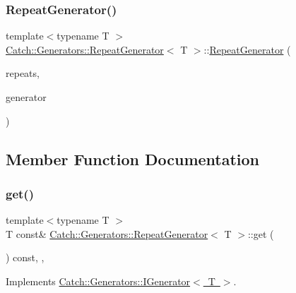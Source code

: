 \subsubsection{\texorpdfstring{Repeat\+Generator()}{RepeatGenerator()}}
{\footnotesize\ttfamily template$<$typename T $>$ \\
\mbox{\hyperlink{class_catch_1_1_generators_1_1_repeat_generator}{Catch\+::\+Generators\+::\+Repeat\+Generator}}$<$ T $>$\+::\mbox{\hyperlink{class_catch_1_1_generators_1_1_repeat_generator}{Repeat\+Generator}} (\begin{DoxyParamCaption}\item[{size\+\_\+t}]{repeats,  }\item[{\mbox{\hyperlink{class_catch_1_1_generators_1_1_generator_wrapper}{Generator\+Wrapper}}$<$ T $>$ \&\&}]{generator }\end{DoxyParamCaption})\hspace{0.3cm}{\ttfamily [inline]}}



\subsection{Member Function Documentation}
\mbox{\label{class_catch_1_1_generators_1_1_repeat_generator_a43bd573274c9a0cd7f4406a3d0d36d49}} 
\subsubsection{\texorpdfstring{get()}{get()}}
{\footnotesize\ttfamily template$<$typename T $>$ \\
T const\& \mbox{\hyperlink{class_catch_1_1_generators_1_1_repeat_generator}{Catch\+::\+Generators\+::\+Repeat\+Generator}}$<$ T $>$\+::get (\begin{DoxyParamCaption}{ }\end{DoxyParamCaption}) const\hspace{0.3cm}{\ttfamily [inline]}, {\ttfamily [override]}, {\ttfamily [virtual]}}



Implements \mbox{\hyperlink{struct_catch_1_1_generators_1_1_i_generator_a525d381fc9249a885b075a0632a8579a}{Catch\+::\+Generators\+::\+I\+Generator$<$ T $>$}}.

